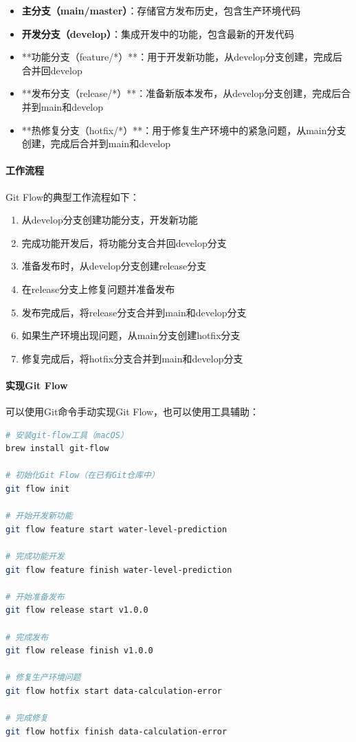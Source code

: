 \begin{itemize}
\tightlist
\item
  \textbf{主分支（main/master）}：存储官方发布历史，包含生产环境代码
\item
  \textbf{开发分支（develop）}：集成开发中的功能，包含最新的开发代码
\item
  **功能分支（feature/*）**：用于开发新功能，从develop分支创建，完成后合并回develop
\item
  **发布分支（release/*）**：准备新版本发布，从develop分支创建，完成后合并到main和develop
\item
  **热修复分支（hotfix/*）**：用于修复生产环境中的紧急问题，从main分支创建，完成后合并到main和develop
\end{itemize}

\paragraph{工作流程}\label{ux5de5ux4f5cux6d41ux7a0b}

Git Flow的典型工作流程如下：

\begin{enumerate}
\def\labelenumi{\arabic{enumi}.}
\tightlist
\item
  从develop分支创建功能分支，开发新功能
\item
  完成功能开发后，将功能分支合并回develop分支
\item
  准备发布时，从develop分支创建release分支
\item
  在release分支上修复问题并准备发布
\item
  发布完成后，将release分支合并到main和develop分支
\item
  如果生产环境出现问题，从main分支创建hotfix分支
\item
  修复完成后，将hotfix分支合并到main和develop分支
\end{enumerate}

\paragraph{实现Git Flow}\label{ux5b9eux73b0git-flow}

可以使用Git命令手动实现Git Flow，也可以使用工具辅助：

\begin{lstlisting}[language=bash]
# 安装git-flow工具（macOS）
brew install git-flow

# 初始化Git Flow（在已有Git仓库中）
git flow init

# 开始开发新功能
git flow feature start water-level-prediction

# 完成功能开发
git flow feature finish water-level-prediction

# 开始准备发布
git flow release start v1.0.0

# 完成发布
git flow release finish v1.0.0

# 修复生产环境问题
git flow hotfix start data-calculation-error

# 完成修复
git flow hotfix finish data-calculation-error
\end{lstlisting}

